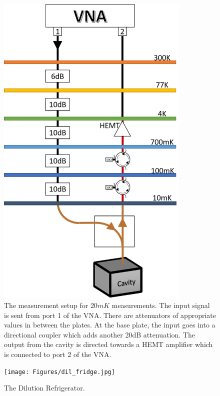 \begin{figure}
\centering
\includegraphics[width=350px]{Figures/circuit.png}
\decoRule
\caption[External Circuit]{The measurement setup for $20mK$ measurements. The input signal is sent from port 1 of the VNA. There are attenuators of appropriate values in between the plates. At the base plate, the input goes into a directional coupler which adds another 20dB attenuation. The output from the cavity is directed towards a HEMT amplifier which is connected to port 2 of the VNA.}
\label{fig:circuit with fridge}
\end{figure}

\begin{figure}
\centering
\texttt{[image: Figures/dil\_fridge.jpg]}
\decoRule
\caption[Dilution Refrigerator]{The Dilution Refrigerator.}
\label{fig:real fridge}
\end{figure}

